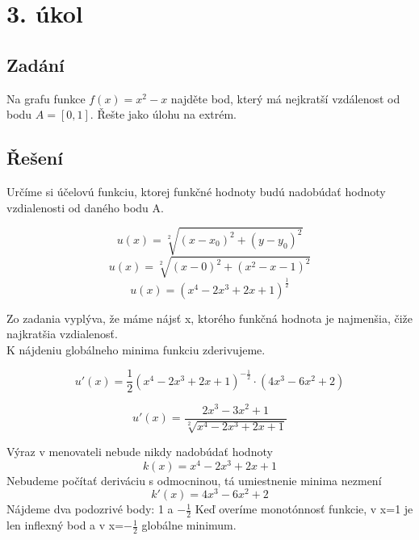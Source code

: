\section{3. úkol}
\subsection{Zadání}

Na grafu funkce \(f(x) = x^2 - x\) najděte bod, který má nejkratší vzdálenost od bodu \(A = [0, 1]\). Řešte jako úlohu na extrém.

\subsection{Řešení}

Určíme si účelovú funkciu, ktorej funkčné hodnoty budú nadobúdať hodnoty vzdialenosti od daného bodu A.

\begin{displaymath}
u(x)=\sqrt[2]{(x-x_0)^2 + (y-y_0)^2}
\end{displaymath}
\begin{displaymath}
u(x)=\sqrt[2]{(x-0)^2 + (x^2-x-1)^2}
\end{displaymath}
\begin{displaymath}
u(x)=(x^4 -2x^3 + 2x + 1)^{\frac{1}{2}}
\end{displaymath}

Zo zadania vyplýva, že máme nájsť x, ktorého funkčná hodnota je najmenšia, čiže najkratšia vzdialenosť. \\
K nájdeniu globálneho minima funkciu zderivujeme.

\begin{displaymath}
u'(x)=\frac{1}{2}(x^4 -2x^3 + 2x + 1)^{-\frac{1}{2}}\cdot(4x^3 - 6x^2 + 2)
\end{displaymath}

\begin{displaymath}
u'(x)=\frac{2x^3 - 3x^2 + 1}{\sqrt[2]{x^4 -2x^3 + 2x + 1}}
\end{displaymath}

Výraz v menovateli nebude nikdy nadobúdať hodnoty 
\begin{displaymath}
k(x)=x^4 -2x^3 + 2x + 1
\end{displaymath}
Nebudeme počítať deriváciu s odmocninou, tá umiestnenie minima nezmení
\begin{displaymath}
k'(x)=4x^3 -6x^2 + 2
\end{displaymath}
Nájdeme dva podozrivé body: 1 a $-\frac{1}{2}$
Keď overíme monotónnosť funkcie, v x=1 je len inflexný bod a v x=$-\frac{1}{2}$ globálne minimum.

